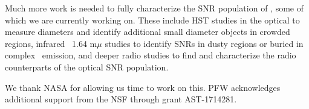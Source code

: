 Much more work is needed to fully characterize the SNR population of \gal, some of which we are currently working on.  These include HST studies in the optical to measure diameters and identify additional small diameter objects in crowded regions, infrared \feii\ 1.64 m$\mu$ studies to identify SNRs in dusty regions or buried in complex \ha\ emission, and deeper radio studies to find and characterize the radio counterparts of the optical SNR population. 

\acknowledgments

We thank NASA for allowing us time to work on this.  PFW acknowledges additional support from the NSF through grant AST-1714281.


\pagebreak





\clearpage




\startlongtable

\clearpage





\pagebreak



\clearpage

\startlongtable



\pagebreak
%


